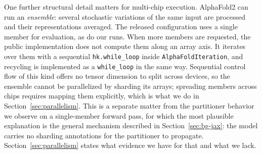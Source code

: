 One further structural detail matters for multi-chip execution.
AlphaFold2 can run an \emph{ensemble}: several stochastic variations of
the same input are processed and their representations averaged. The
released configuration uses a single member for evaluation, as do our
runs. When more members are requested, the public implementation does
not compute them along an array axis. It iterates over them with a
sequential \texttt{hk.while\_loop} inside \texttt{AlphaFoldIteration},
and recycling is implemented as a \texttt{while\_loop} in the same way.
Sequential control flow of this kind offers no tensor dimension to
split across devices, so the ensemble cannot be parallelized by
sharding its arrays; spreading members across chips requires mapping
them explicitly, which is what we do in Section~\ref{sec:parallelism}.
This is a separate matter from the partitioner behavior we observe on a
single-member forward pass, for which the most plausible explanation
is the general mechanism described in Section~\ref{sec:bg-jax}: the
model carries no sharding annotations for the partitioner to propagate.
Section~\ref{sec:parallelism} states what evidence we have for that
and what we lack.
